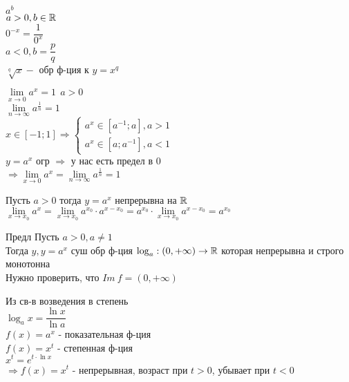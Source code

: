 \pagebreak
$ a^b\ $ \\
$ a > 0, b \in \mathbb{R} $ \\
$ 0^{-x} = \dfrac{1}{0^x} $ \\
$ a < 0, b = \dfrac{p}{q} $\\
$ \sqrt[q]{x} - $ обр ф-ция к 	$ y = x^q $ 
\begin{lemma}
	$ \lim\limits_{x \rightarrow 0} a^x = 1 \ \ a > 0 $ \\
	$ \lim\limits_{n \rightarrow \infty} a^{\frac{1}{n}} = 1 $ \\ 
	$ x \in [-1; 1] \Rightarrow \left\{ \begin{array}{l}
		a^x \in [ a^{-1}; a ], a > 1 \\ a^x \in [a; a^{-1}], a < 1 
	\end{array} \right. $\\
	$ y = a^x $ огр $\Rightarrow$ у нас есть предел в 0\\ %
	$ \Rightarrow \lim\limits_{x\rightarrow 0} a^x = \lim\limits_{n \rightarrow \infty} a^{\frac{1}{n}} = 1 $
\end{lemma} 
\begin{theorem} Пусть $ a > 0 $ тогда $ y = a^x $ непрерывна на $ \mathbb{R} $ \\
	$ \lim\limits_{x \rightarrow x_0} a^x = \lim\limits_{x \rightarrow x_0}  a^{x_0} \cdot a^{x-x_0} = a^{x_0} \cdot \lim\limits_{x \rightarrow x_0} a^{x-x_0} = a^{x_0} $ 
\end{theorem}
Предл Пусть $ a > 0, a \neq 1 $\\
Тогда $ y, y=a^x $ суш обр ф-ция $ \log_a : (0, +\infty) \rightarrow \mathbb{R} $ которая непрерывна и строго монотонна \\
Нужно проверить, что $ Im \ f = (0, +\infty) $

Из св-в возведения в степень \\
$ \log_a x= \dfrac{\ln x}{\ln a} $\\
$ f(x) = a^x $ - показательная ф-ция \\
$ f(x) = x^t $ - степенная ф-ция \\
$ x^t = e^{t \cdot \ln x}$ \\
$ \Rightarrow f(x) = x^t $ - непрерывная, возраст при $ t > 0 $, убывает при $ t < 0 $ \\


